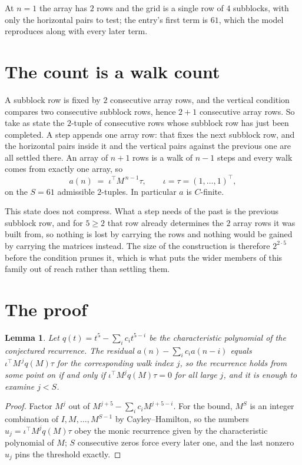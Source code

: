 \documentclass[11pt,a4paper]{article}
\theoremstyle{plain}
\newtheorem{lemma}[theorem]{Lemma}
\theoremstyle{definition}
\begin{document}
At $n=1$ the array has $2$ rows and the grid is a single row of $4$
subblocks, with only the horizontal pairs to test; the entry's first term is
$61$, which the model reproduces along with every later term.

\section{The count is a walk count}

A subblock row is fixed by $2$ consecutive array rows, and the vertical condition compares
two consecutive subblock rows, hence $2+1$ consecutive array rows. So take as state the
$2$-tuple of consecutive rows whose subblock row has just been completed. A step appends one
array row: that fixes the next subblock row, and the horizontal pairs inside it and the
vertical pairs against the previous one are all settled there. An array of $n+1$ rows is
a walk of $n-1$ steps and every walk comes from exactly one array, so
\[
a(n)\;=\;\iota^{\!\top}M^{\,n-1}\tau,\qquad\iota=\tau=(1,\dots,1)^{\!\top},
\]
on the $S=61$ admissible $2$-tuples. In particular $a$ is $C$-finite.

This state does not compress. What a step needs of the past is the previous subblock row, and
for $5\ge2$ that row already determines the $2$ array rows it was built from, so nothing
is lost by carrying the rows and nothing would be gained by carrying the matrices instead. The
size of the construction is therefore $2^{2\cdot5}$ before the condition prunes
it, which is what puts the wider members of this family out of reach rather than settling them.

\section{The proof}

\begin{lemma}\label{lem:crit}
Let $q(t)=t^{5}-\sum_i c_it^{5-i}$ be the characteristic polynomial of the
conjectured recurrence. The residual $a(n)-\sum_ic_ia(n-i)$ equals
$\iota^{\!\top}M^{\,j}q(M)\tau$ for the corresponding walk index $j$, so the recurrence
holds from some point on if and only if $\iota^{\!\top}M^{j}q(M)\tau=0$ for all large $j$,
and it is enough to examine $j<S$.
\end{lemma}

\begin{proof}
Factor $M^{j}$ out of $M^{j+5}-\sum_ic_iM^{j+5-i}$. For the bound, $M^{S}$
is an integer combination of $I,M,\dots,M^{S-1}$ by Cayley--Hamilton, so the numbers
$u_j=\iota^{\!\top}M^{j}q(M)\tau$ obey the monic recurrence given by the characteristic
polynomial of $M$; $S$ consecutive zeros force every later one, and the last nonzero $u_j$
pins the threshold exactly.
\end{proof}
\end{document}
